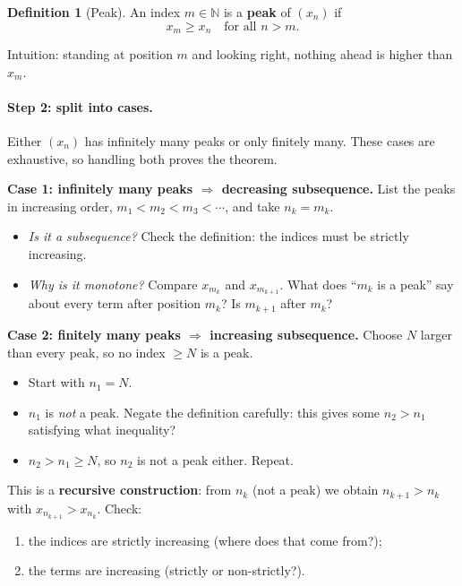 \documentclass[11pt]{article}
\theoremstyle{definition}
\newtheorem{defn}{Definition}[section]
\newcommand{\N}{\mathbb{N}}
\newcommand{\key}[1]{\textcolor{red!70!black}{\textbf{#1}}}
\begin{document}
\begin{defn}[Peak]
An index $m\in\N$ is a \textbf{peak} of $(x_n)$ if
\[
  x_m \ge x_n \quad \text{for all } n > m.
\]
\end{defn}

\noindent Intuition: standing at position $m$ and looking right, nothing
ahead is higher than $x_m$.

\paragraph{Step 2: split into cases.}
Either $(x_n)$ has infinitely many peaks or only finitely many. These cases
are exhaustive, so handling both proves the theorem.

\medskip
\noindent\key{Case 1: infinitely many peaks $\Rightarrow$ decreasing
subsequence.}
List the peaks in increasing order, $m_1<m_2<m_3<\cdots$, and take
$n_k=m_k$.
\begin{itemize}[nosep]
  \item \emph{Is it a subsequence?} Check the definition: the indices must
        be strictly increasing.
  \item \emph{Why is it monotone?} Compare $x_{m_k}$ and $x_{m_{k+1}}$.
        What does ``$m_k$ is a peak'' say about every term after position
        $m_k$? Is $m_{k+1}$ after $m_k$?
\end{itemize}

\medskip
\noindent\key{Case 2: finitely many peaks $\Rightarrow$ increasing
subsequence.}
Choose $N$ larger than every peak, so no index $\ge N$ is a peak.
\begin{itemize}[nosep]
  \item Start with $n_1=N$.
  \item $n_1$ is \emph{not} a peak. Negate the definition carefully: this
        gives some $n_2>n_1$ satisfying what inequality?
  \item $n_2>n_1\ge N$, so $n_2$ is not a peak either. Repeat.
\end{itemize}
This is a \textbf{recursive construction}: from $n_k$ (not a peak) we
obtain $n_{k+1}>n_k$ with $x_{n_{k+1}}>x_{n_k}$. Check:
\begin{enumerate}[nosep]
  \item the indices are strictly increasing (where does that come from?);
  \item the terms are increasing (strictly or non-strictly?).
\end{enumerate}
\end{document}
